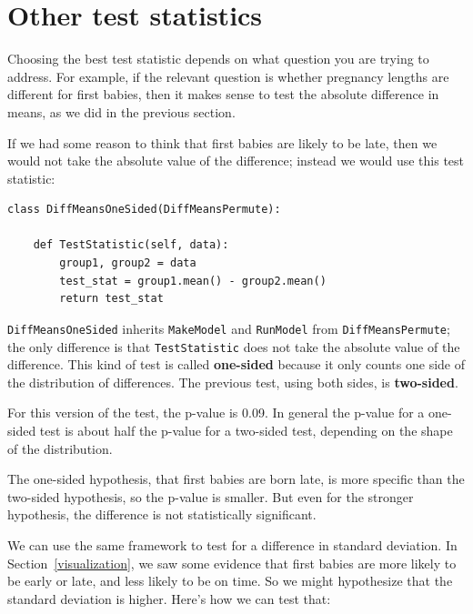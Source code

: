 \documentclass[12pt]{book}
\begin{document}
\section{Other test statistics}

Choosing the best test statistic depends on what question you are
trying to address.  For example, if the relevant question is whether
pregnancy lengths are different for first
babies, then it makes sense to test the absolute difference in means,
as we did in the previous section.

If we had some reason to think that first babies are likely
to be late, then we would not take the absolute value of the difference;
instead we would use this test statistic:

\begin{verbatim}
class DiffMeansOneSided(DiffMeansPermute):

    def TestStatistic(self, data):
        group1, group2 = data
        test_stat = group1.mean() - group2.mean()
        return test_stat
\end{verbatim}

\verb"DiffMeansOneSided" inherits \verb"MakeModel" and \verb"RunModel"
from \verb"DiffMeansPermute"; the only difference is that
\verb"TestStatistic" does not take the absolute value of the
difference.  This kind of test is called {\bf one-sided} because
it only counts one side of the distribution of differences.  The
previous test, using both sides, is {\bf two-sided}.

For this version of the test, the p-value is 0.09.  In general
the p-value for a one-sided test is about half the p-value for
a two-sided test, depending on the shape of the distribution.

The one-sided hypothesis, that first babies are born late, is more
specific than the two-sided hypothesis, so the p-value is smaller.
But even for the stronger hypothesis, the difference is
not statistically significant.
   

We can use the same framework to test for a difference in standard
deviation.  In Section~\ref{visualization}, we saw some evidence that
first babies are more likely to be early or late, and less likely to
be on time.  So we might hypothesize that the standard deviation is
higher.  Here's how we can test that:
\end{document}
